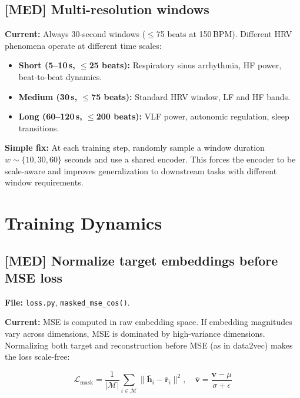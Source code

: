 \documentclass[11pt,a4paper]{article}
\newcommand{\med}[1]{\textcolor{impactmed}{\textbf{[MED]} #1}}
\newcommand{\file}[1]{\texttt{#1}}
\begin{document}
\subsection{\med{Multi-resolution windows}}

\textbf{Current:} Always 30-second windows ($\leq$75 beats at 150\,BPM).
Different HRV phenomena operate at different time scales:

\begin{itemize}[leftmargin=*]
    \item \textbf{Short (5--10\,s, $\leq$25 beats):} Respiratory sinus arrhythmia, HF power, beat-to-beat dynamics.
    \item \textbf{Medium (30\,s, $\leq$75 beats):} Standard HRV window, LF and HF bands.
    \item \textbf{Long (60--120\,s, $\leq$200 beats):} VLF power, autonomic regulation, sleep transitions.
\end{itemize}

\textbf{Simple fix:} At each training step, randomly sample a window duration
$w \sim \{10, 30, 60\}$ seconds and use a shared encoder.
This forces the encoder to be scale-aware and improves generalization
to downstream tasks with different window requirements.

\section{Training Dynamics}

\subsection{\med{Normalize target embeddings before MSE loss}}

\textbf{File:} \file{loss.py}, \texttt{masked\_mse\_cos()}.

\textbf{Current:} MSE is computed in raw embedding space.
If embedding magnitudes vary across dimensions, MSE is dominated by
high-variance dimensions. Normalizing both target and reconstruction
before MSE (as in data2vec) makes the loss scale-free:

\[
    \mathcal{L}_{\text{mask}} = \frac{1}{|\mathcal{M}|}
    \sum_{i \in \mathcal{M}}
    \bigl\|\bar{\mathbf{h}}_i - \bar{\mathbf{r}}_i\bigr\|^2,
    \quad
    \bar{\mathbf{v}} = \frac{\mathbf{v} - \mu}{\sigma + \epsilon}
\]
\end{document}
